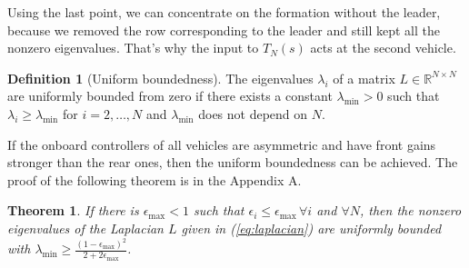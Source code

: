 \documentclass[technote, 10pt, twoside]{IEEEtran}
\newcommand{\wn}{i}
\newcommand{\numVeh}{N}
\newcommand{\lapl}{{L}}
\newcommand{\spatEig}{\lambda} \newcommand{\spatEigWn}{\lambda_\wn}
\newcommand{\spatEigMin}{\spatEig_{\min}}
\newcommand{\diagTransBlockEig}{T}
\newcommand{\diagTransBlockN}{\diagTransBlockEig_{\numVeh}}
\theoremstyle{plain}
\newtheorem{theorem}{Theorem}
\theoremstyle{definition}
\newtheorem{definition}{Definition}
\theoremstyle{assump}
\begin{document}
	Using the last point, we can concentrate on the formation without the
	leader, because we removed the row corresponding to the leader and still kept all
	the nonzero eigenvalues. That's why the input to $\diagTransBlockN(s)$ acts at
	the second vehicle.
\begin{definition}[Uniform boundedness] The eigenvalues $\spatEig_i$ of a matrix $\lapl \in \mathbb{R}^{\numVeh \times \numVeh}$ are uniformly bounded from zero if there exists a constant $\spatEigMin>0$ such that $\spatEig_i  \geq \spatEigMin$ for  $i=2,\ldots,\numVeh$ and $\spatEigMin$ does not depend on $\numVeh$.
\end{definition}
If the onboard controllers of all vehicles are asymmetric and have
front gains stronger than the rear ones, then the uniform boundedness can be
achieved.
The proof of the following theorem is in the Appendix A.
\begin{theorem}
If there is $\epsilon_{\max} < 1$ such that $\epsilon_i \leq
\epsilon_{\max} \, \forall i$ and $\forall \numVeh$, then the nonzero
eigenvalues of the Laplacian $\lapl$ given in (\ref{eq:laplacian}) are uniformly bounded with 
$\spatEigMin \geq \frac{(1-\epsilon_{\max})^2}{2+2\epsilon_{\max}}$.
	\label{thm:uniformBound}
\end{theorem}
\end{document}

